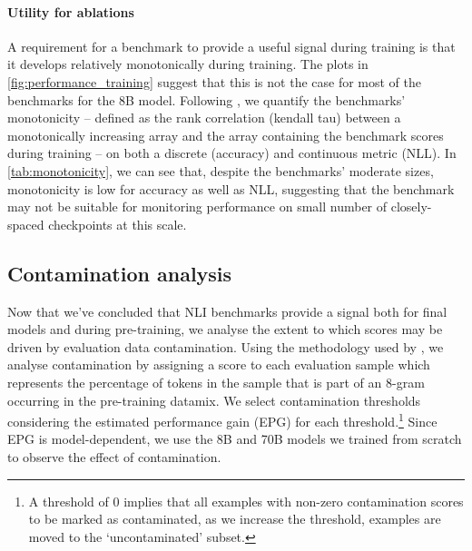 \paragraph{Utility for ablations}
A requirement for a benchmark to provide a useful signal during training is that it develops relatively monotonically during training.
The plots in \cref{fig:performance_training} suggest that this is not the case for most of the benchmarks for the 8B model.
Following \citet{variancepaper}, we quantify the benchmarks' monotonicity -- defined as the rank correlation (kendall tau) between a monotonically increasing array and the array containing the benchmark scores during training -- on both a discrete (accuracy) and continuous metric (NLL). %
In \cref{tab:monotonicity}, we can see that, despite the benchmarks' moderate sizes, monotonicity is low for accuracy as well as NLL, suggesting that the benchmark may not be suitable for monitoring performance on small number of closely-spaced checkpoints at this scale. %


\subsection{Contamination analysis}\label{subsec:contamination}

Now that we've concluded that NLI benchmarks provide a signal both for final models and during pre-training, we analyse the extent to which scores may be driven by evaluation data contamination.
Using the methodology used by \citet{dubey2024llama}, we analyse contamination by assigning a score to each evaluation sample which represents the percentage of tokens in the sample that is part of an 8-gram occurring in the pre-training datamix.
We select contamination thresholds considering the estimated performance gain (EPG) for each threshold.\footnote{A threshold of 0 implies that all examples with non-zero contamination scores to be marked as contaminated, as we increase the threshold, examples are moved to the `uncontaminated' subset.}
Since EPG is model-dependent, we use the 8B and 70B models we trained from scratch to observe the effect of contamination.

